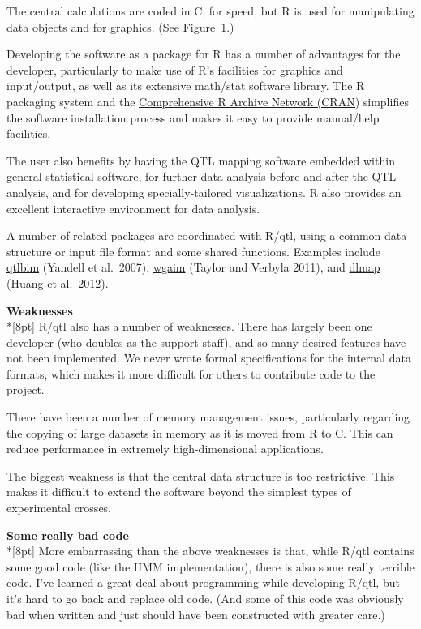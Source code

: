 \documentclass[letterpaper]{article}
\begin{document}
\begin{multicols}{2}
The central calculations are coded in C, for speed, but R is used for
manipulating data objects and for graphics. (See Figure~1.)

Developing the software as a package for R has a number of advantages
for the developer, particularly to make use of R's facilities for
graphics and input/output, as well as its extensive math/stat software
library. The R packaging system and the
\href{http://cran.r-project.org}{Comprehensive R Archive Network (CRAN)}
simplifies the software installation process and makes it easy to
provide manual/help facilities.

The user also benefits by having the QTL mapping software embedded
within general statistical software, for further data analysis before
and after the QTL analysis, and for developing specially-tailored
visualizations. R also provides an excellent interactive environment
for data analysis.

A number of related packages are coordinated with R/qtl, using a
common data structure or input file format and some shared functions.
Examples include \href{http://www.ssg.uab.edu/qtlbim/}{qtlbim}
(Yandell et al.\ 2007),
\href{http://cran.r-project.org/web/packages/wgaim/index.html}{wgaim}
(Taylor and Verbyla 2011),
and \href{http://cran.r-project.org/web/packages/dlmap/}{dlmap} (Huang
et al.\ 2012).


\bigskip
{}
\noindent \textbf{\sffamily Weaknesses}\\*[8pt]
R/qtl also has a number of weaknesses. There has largely been one
developer (who doubles as the support staff), and so many desired features have not
been implemented. We never wrote formal specifications for the
internal data formats, which makes it more difficult for others to
contribute code to the project.

There have been a number of memory management issues, particularly
regarding the copying of large datasets in memory as it is moved from
R to C. This can reduce performance in extremely high-dimensional
applications.

The biggest weakness is that the central data structure is too
restrictive. This makes it difficult to extend the software beyond
the simplest types of experimental crosses.


\bigskip
{}
\noindent \textbf{\sffamily Some really bad code}\\*[8pt]
More embarrassing than the above weaknesses is that, while R/qtl
contains some good code (like the HMM implementation), there is also
some really terrible code. I've learned a great deal about programming
while developing R/qtl, but it's hard to go back and replace old code.
(And some of this code was obviously bad when written and just should
have been constructed with greater care.)


\end{multicols}
\end{document}
